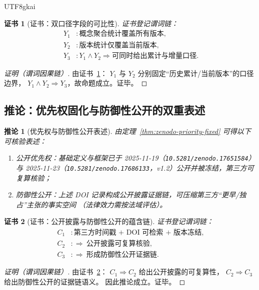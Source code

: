 \documentclass[12pt]{article}
\newtheorem{corollary}{推论}[section]
\newtheorem{Certificate}{证书}[section]
\begin{document}
\begin{CJK*}{UTF8}{gkai}
\begin{Certificate}[证书：双口径字段的可比性]
\label{cert:zenodo-stats-dual-reporting}
证书登记谓词链：
\[
\begin{aligned}
  Y_1 &: \text{概念聚合统计覆盖所有版本},\\
  Y_2 &: \text{版本统计仅覆盖当前版本},\\
  Y_3 &: Y_1\wedge Y_2\Rightarrow \text{可同时给出累计与增量口径}.
\end{aligned}
\]
\end{Certificate}

\begin{proof}[证明（谓词因果链）]
由证书~\ref{cert:zenodo-stats-dual-reporting}：
$Y_1$ 与 $Y_2$ 分别固定“历史累计/当前版本”的口径边界，
$Y_1\wedge Y_2\Rightarrow Y_3$，故命题成立。证毕。
\end{proof}

\subsection{推论：优先权固化与防御性公开的双重表述}
\label{sec:zenodo-priority-corollary}

\begin{corollary}[优先权与防御性公开表述]
\label{cor:zenodo-priority-defensive}
由定理~\ref{thm:zenodo-priority-fixed} 可得以下可核验表述：
\begin{enumerate}
  \item 公开优先权：基础定义与框架已于 2025-11-19（\texttt{10.5281/zenodo.17651584}）与
  2025-11-23（\texttt{10.5281/zenodo.17686133}，v1.2）公开并被冻结，第三方可复算核验；
  \item 防御性公开：上述 DOI 记录构成公开披露证据链，可压缩第三方“更早/独占”主张的事实空间
  （法律效力需按法域评估）。
\end{enumerate}
\end{corollary}

\begin{Certificate}[证书：公开披露与防御性公开的蕴含链]
\label{cert:zenodo-priority-defensive}
证书登记谓词链：
\[
\begin{aligned}
  C_1 &: \text{第三方时间戳 + DOI 可检索 + 版本冻结},\\
  C_2 &: \Rightarrow\ \text{公开披露可复算核验},\\
  C_3 &: \Rightarrow\ \text{形成防御性公开证据链}.
\end{aligned}
\]
\end{Certificate}

\begin{proof}[证明（谓词因果链）]
由证书~\ref{cert:zenodo-priority-defensive}：
$C_1\Rightarrow C_2$ 给出公开披露的可复算性，
$C_2\Rightarrow C_3$ 给出防御性公开的证据链语义。
因此推论成立。证毕。
\end{proof}


\end{CJK*}
\end{document}
